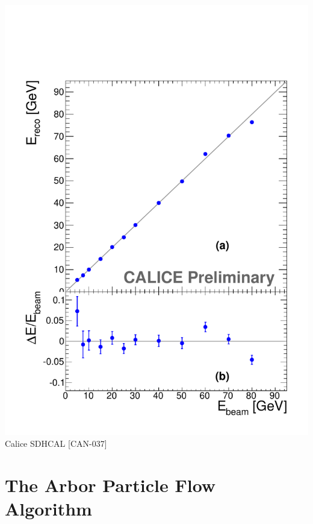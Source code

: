 \documentclass[8pt]{beamer}
\begin{document}
\begin{frame}
\begin{minipage}{0.5\linewidth}
\begin{center}
        \includegraphics[width=\linewidth]{Energy-Linearity.pdf} \\
        Calice SDHCAL [CAN-037]
      \end{center}
    \end{minipage}
  \end{frame}
  
  \section{The Arbor Particle Flow Algorithm}
  
\end{document}
